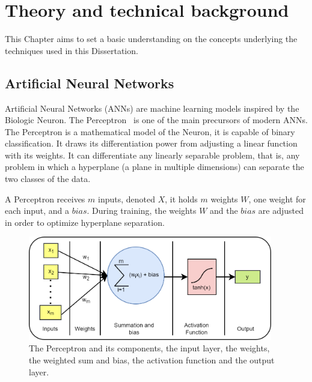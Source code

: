 \newpage

\chapter{Theory and technical background}
\label{chap:theory}

This Chapter aims to set a basic understanding on the concepts underlying the techniques used in this Dissertation.

\section{Artificial Neural Networks}\label{sec:NNs}

Artificial Neural Networks (ANNs) are machine learning models inspired by the Biologic Neuron. The Perceptron~\cite{rosenbaltt1957perceptron} is one of the main precursors of modern ANNs. The Perceptron is a mathematical model of the Neuron, it is capable of binary classification. It draws its differentiation power from adjusting a linear function with its weights. It can differentiate any linearly separable problem, that is, any problem in which a hyperplane (a plane in multiple dimensions) can separate the two classes of the data.

A Perceptron receives $m$ inputs, denoted $X$, it holds $m$ weights $W$, one weight for each input, and a $bias$. During training, the weights $W$ and the $bias$ are adjusted in order to optimize hyperplane separation.

\begin{figure}[!ht]
    \centering
    \includegraphics[width=0.95\textwidth]{img/Perceptron.drawio.png}
    \caption{The Perceptron and its components, the input layer, the weights, the weighted sum and bias, the activation function and the output layer.}
    \label{fig:perceptron}
\end{figure}


